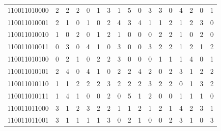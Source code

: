 \documentclass[10pt,a4paper]{article}
\begin{document}
\begin{longtable}{ |c|c|c|c|c|c|c|c|c|c|c|c|c|c|c|c|c| }
    110011010000              & 2                            & 2                                & 2                            & 0                              & 1   & 3   & 1   & 5   & 0   & 3   & 3   & 0   & 4   & 2   & 0   & 1   \\
    110011010001              & 2                            & 1                                & 0                            & 1                              & 0   & 2   & 4   & 3   & 4   & 1   & 1   & 2   & 1   & 2   & 3   & 0   \\
    110011010010              & 1                            & 0                                & 2                            & 0                              & 1   & 2   & 1   & 0   & 0   & 0   & 2   & 2   & 1   & 0   & 2   & 0   \\
    110011010011              & 0                            & 3                                & 0                            & 4                              & 1   & 0   & 3   & 0   & 0   & 3   & 2   & 2   & 1   & 2   & 1   & 2   \\
    110011010100              & 0                            & 2                                & 1                            & 0                              & 2   & 2   & 3   & 0   & 0   & 0   & 1   & 1   & 1   & 4   & 0   & 1   \\
    110011010101              & 2                            & 4                                & 0                            & 4                              & 1   & 0   & 2   & 2   & 4   & 2   & 0   & 2   & 3   & 1   & 2   & 2   \\
    110011010110              & 1                            & 1                                & 2                            & 2                              & 2   & 3   & 2   & 2   & 2   & 3   & 2   & 2   & 0   & 1   & 3   & 2   \\
    110011010111              & 1                            & 4                                & 1                            & 0                              & 0   & 2   & 0   & 5   & 1   & 2   & 0   & 0   & 1   & 1   & 1   & 0   \\
    110011011000              & 3                            & 1                                & 2                            & 3                              & 2   & 2   & 1   & 1   & 2   & 1   & 2   & 1   & 4   & 2   & 3   & 1   \\
    110011011001              & 3                            & 1                                & 1                            & 1                              & 1   & 3   & 0   & 2   & 1   & 0   & 0   & 2   & 3   & 1   & 0   & 3   \\

\end{longtable}
\end{document}
